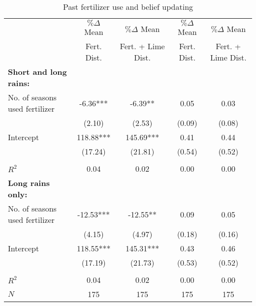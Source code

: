 \begin{table}[htbp]
\centering
\hspace*{-1.2cm}
\begin{threeparttable}
\caption{Past fertilizer use and belief updating }
\label{tab:A1updating}
\begin{tabular}{l cccc}
\hline
\hline
& $\%\Delta$ Mean & $\%\Delta$ Mean & $\%\Delta$ Mean & $\%\Delta$ Mean \\
& Fert. Dist. & Fert. + Lime Dist. & Fert. Dist. & Fert. + Lime Dist. \\ \hline
\textbf{Short and long rains:}&               &               &               &               \\
No. of seasons used fertilizer&       -6.36***&       -6.39** &        0.05   &        0.03   \\
                    &      (2.10)   &      (2.53)   &      (0.09)   &      (0.08)   \\
Intercept           &      118.88***&      145.69***&        0.41   &        0.44   \\
                    &     (17.24)   &     (21.81)   &      (0.54)   &      (0.52)   \\
                    &               &               &               &               \\
$R^2$               &        0.04   &        0.02   &        0.00   &        0.00   \\
\hline
%
\textbf{Long rains only:}&               &               &               &               \\
No. of seasons used fertilizer&      -12.53***&      -12.55** &        0.09   &        0.05   \\
                    &      (4.15)   &      (4.97)   &      (0.18)   &      (0.16)   \\
Intercept           &      118.55***&      145.31***&        0.43   &        0.46   \\
                    &     (17.19)   &     (21.73)   &      (0.53)   &      (0.52)   \\
                    &               &               &               &               \\
$R^2$               &        0.04   &        0.02   &        0.00   &        0.00   \\
 \hline %
$N$                 &         175   &         175   &         175   &         175   \\

\end{tabular}
\end{threeparttable}
\end{table}

